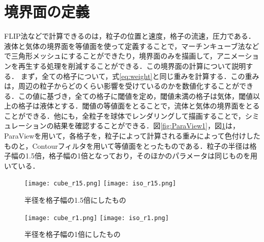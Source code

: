 \documentclass[a4j,12pt]{jreport}
\begin{document}
\section{境界面の定義} \label{sec:boundaly_def}
FLIP法などで計算できるのは，粒子の位置と速度，格子の流速，圧力である．液体と気体の境界面を等値面を使って定義することで，マーチンキューブ法などで三角形メッシュにすることができたり，境界面のみを描画して，アニメーションを再生する処理を削減することができる．この境界面の計算について説明する．
まず，全ての格子について，式\ref{eq:weight}と同じ重みを計算する．この重みは，周辺の粒子からどのくらい影響を受けているのかを数値化することができる．この値に基づき，全ての格子に閾値を定め，閾値未満の格子は気体，閾値以上の格子は液体とする．閾値の等値面をとることで，流体と気体の境界面をとることができる．他にも，全粒子を球体でレンダリングして描画することで，シミュレーションの結果を確認することができる．図\ref{fig:ParaView1}，図\ref{fig:ParaView2}は，ParaViewを用いて，各格子を，粒子によって計算される重みによって色付けしたものと，Contourフィルタを用いて等値面をとったものである．粒子の半径は格子幅の1.5倍，格子幅の1倍となっており，そのほかのパラメータは同じものを用いている．
\begin{figure}[H]
  \begin{minipage}[b]{0.5\linewidth}
    \centering
    \texttt{[image: cube\_r15.png]}
        \texttt{[image: iso\_r15.png]}
    \caption{半径を格子幅の1.5倍にしたもの}
    \label{fig:ParaView1}
  \end{minipage}
  \begin{minipage}[b]{0.45\linewidth}
    \centering
    \texttt{[image: cube\_r1.png]}
    \texttt{[image: iso\_r1.png]}
    \caption{半径を格子幅の1倍にしたもの}
    \label{fig:ParaView2}
  \end{minipage}
\end{figure}
\end{document}

